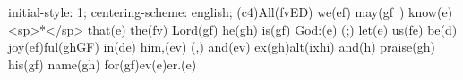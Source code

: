 initial-style: 1;
centering-scheme: english;
(c4)All(fvED) we(ef) may(gf~) know(e) <sp>*</sp> that(e) the(fv) Lord(gf) he(gh) is(gf) God:(e) (;) let(e) us(fe) be(d) joy(ef)ful(ghGF) in(de) him,(ev) (,) and(ev) ex(gh)alt(ixhi) and(h) praise(gh) his(gf) name(gh) for(gf)ev(e)er.(e)
